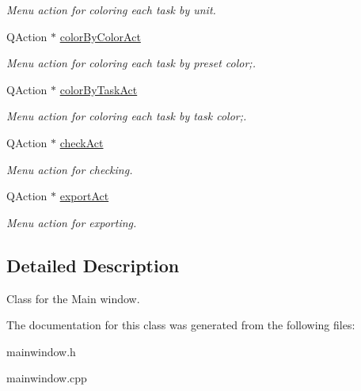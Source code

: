 \begin{DoxyCompactItemize}
\begin{DoxyCompactList}\small\item\em Menu action for coloring each task by unit. \end{DoxyCompactList}\item 
\hypertarget{class_main_window_afd6cf07dd21a8cde228102b8798ac49d}{}Q\+Action $\ast$ \hyperlink{class_main_window_afd6cf07dd21a8cde228102b8798ac49d}{color\+By\+Color\+Act}\label{class_main_window_afd6cf07dd21a8cde228102b8798ac49d}

\begin{DoxyCompactList}\small\item\em Menu action for coloring each task by preset color;. \end{DoxyCompactList}\item 
\hypertarget{class_main_window_a4c72320ca62b13088dc5ca562cba2761}{}Q\+Action $\ast$ \hyperlink{class_main_window_a4c72320ca62b13088dc5ca562cba2761}{color\+By\+Task\+Act}\label{class_main_window_a4c72320ca62b13088dc5ca562cba2761}

\begin{DoxyCompactList}\small\item\em Menu action for coloring each task by task color;. \end{DoxyCompactList}\item 
\hypertarget{class_main_window_ab6bb74007a03a6d6e97fa3b4c92cd0da}{}Q\+Action $\ast$ \hyperlink{class_main_window_ab6bb74007a03a6d6e97fa3b4c92cd0da}{check\+Act}\label{class_main_window_ab6bb74007a03a6d6e97fa3b4c92cd0da}

\begin{DoxyCompactList}\small\item\em Menu action for checking. \end{DoxyCompactList}\item 
\hypertarget{class_main_window_acb019ac85cd188f2738421da7095e932}{}Q\+Action $\ast$ \hyperlink{class_main_window_acb019ac85cd188f2738421da7095e932}{export\+Act}\label{class_main_window_acb019ac85cd188f2738421da7095e932}

\begin{DoxyCompactList}\small\item\em Menu action for exporting. \end{DoxyCompactList}\end{DoxyCompactItemize}


\subsection{Detailed Description}
Class for the Main window. 

The documentation for this class was generated from the following files\+:\begin{DoxyCompactItemize}
\item 
mainwindow.\+h\item 
mainwindow.\+cpp\end{DoxyCompactItemize}
